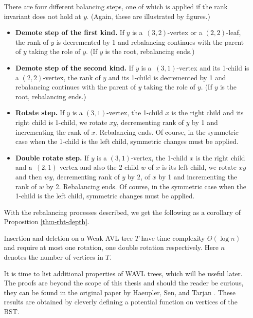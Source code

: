There are four different balancing steps, one of which is applied if the rank invariant does not hold at $y$. (Again, these are illustrated by figures.)
\begin{itemize}
	\item \textbf{Demote step of the first kind.} If $y$ is a~$(3,2)$-vertex or a $(2,2)$-leaf, the rank of $y$ is decremented by 1 and rebalancing continues with the parent of $y$ taking the role of $y$. (If $y$ is the root, rebalancing ends.)
	\item \textbf{Demote step of the second kind.} If $y$ is a~$(3,1)$-vertex and its 1-child is a $(2,2)$-vertex, the rank of $y$ and its 1-child is decremented by 1 and rebalancing continues with the parent of $y$ taking the role of $y$. (If $y$ is the root, rebalancing ends.)
	\item \textbf{Rotate step.} If $y$ is a $(3,1)$-vertex, the 1-child $x$ is the right child and its right child is 1-child, we rotate $xy$, decrementing rank of $y$ by 1 and incrementing the rank of $x$. Rebalancing ends. Of course, in the symmetric case when the 1-child is the left child, symmetric changes must be applied.
	\item \textbf{Double rotate step.} If $y$ is a $(3,1)$-vertex, the 1-child $x$ is the right child and a~$(2,1)$-vertex and also the 2-child $w$ of $x$ is its left child, we rotate $xy$ and then $wy$, decrementing rank of $y$ by 2, of $x$ by 1 and incrementing the rank of $w$ by 2. Rebalancing ends. Of course, in the symmetric case when the 1-child is the left child, symmetric changes must be applied.
\end{itemize}









With the rebalancing processes described, we get the following as a corollary of Proposition \ref{thm-rbt-depth}.

\begin{prop}
Insertion and deletion on a Weak AVL tree $T$ have time complexity $\Theta(\log n)$ and require at most one rotation, one double rotation respectively. Here $n$ denotes the number of vertices in $T$.
\end{prop}

It is time to list additional properties of WAVL trees, which will be useful later. The proofs are beyond the scope of this thesis and should the reader be curious, they can be found in the original paper by Haeupler, Sen, and Tarjan \cite{rank-balanced-trees}. These results are obtained by cleverly defining a potential function on vertices of the BST.

